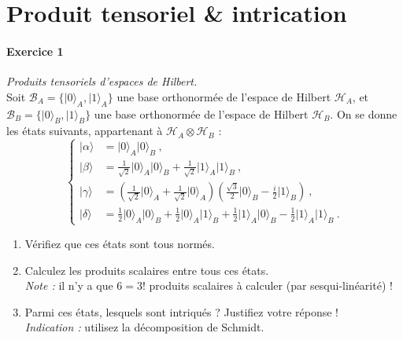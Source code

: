 \section{Produit tensoriel \& intrication}

\paragraph{Exercice 1} \textit{Produits tensoriels d'espaces de Hilbert.} \\
Soit $\mathcal B_A = \{ \vert 0 \rangle_A ,  \vert 1 \rangle_A\}$ une base orthonormée de l'espace de Hilbert $\mathcal H_A$, et $\mathcal B_B = \{ \vert 0 \rangle_B ,  \vert 1 \rangle_B\}$ une base orthonormée de l'espace de Hilbert $\mathcal H_B$. On se donne les états suivants, appartenant à $\mathcal H_A \otimes \mathcal H_B$ :
\begin{equation}
\left\lbrace
\begin{split}
\vert \alpha \rangle &= \vert 0 \rangle_A \vert 0 \rangle_B\ , \\
\vert \beta \rangle &= \frac{1}{\sqrt{2}}\vert 0 \rangle_A \vert 0 \rangle_B +   \frac{1}{\sqrt{2}}\vert 1 \rangle_A \vert 1 \rangle_B\ , \\
\vert \gamma \rangle &= \left( \frac{1}{\sqrt{2}}\vert 0 \rangle_A
+\frac{1}{\sqrt{2}}\vert 0 \rangle_A \right) \left(  \frac{\sqrt{3}}{2}
\vert 0 \rangle_B  -  \frac{i}{2}\vert 1 \rangle_B  \right)\ , 
 \\
 \vert \delta\rangle &= 
 \frac{1}{2}\vert 0 \rangle_A \vert 0 \rangle_B
 +\frac{1}{2}\vert 0 \rangle_A \vert 1 \rangle_B
  +\frac{1}{2}\vert 1 \rangle_A \vert 0 \rangle_B
   -\frac{1}{2}\vert 1 \rangle_A \vert 1 \rangle_B\ .
\end{split}
\right.
\end{equation}

\begin{enumerate}
\item Vérifiez que ces états sont tous normés.
\item Calculez les produits scalaires entre tous ces états. \\
\textit{Note :} il n'y a que $6=3!$ produits scalaires à calculer (par sesqui-linéarité) !
\item Parmi ces états, lesquels sont intriqués ? Justifiez votre réponse ! \\
\textit{Indication :} utilisez la décomposition de Schmidt.
\end{enumerate}

